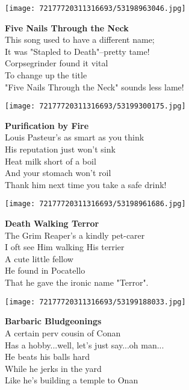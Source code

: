 \documentclass[10pt,letterpaper]{article}
\begin{document}
\begin{center}\texttt{[image: 72177720311316693/53198963046.jpg]}
\end{center}
\begin{center}
\textbf{Five Nails Through the Neck}\\
\vskip 0.2in
This song used to have a different name;\\
It was "Stapled to Death"--pretty tame!\\
Corpsegrinder found it vital\\
To change up the title\\
"Five Nails Through the Neck" sounds less lame!\\
\end{center}
\pagebreak

\begin{center}
\texttt{[image: 72177720311316693/53199300175.jpg]}
\end{center}

\begin{center}
\textbf{Purification by Fire}\\
\vskip 0.2in
Louis Pasteur's as smart as you think\\
His reputation just won't sink\\
Heat milk short of a boil\\
And your stomach won't roil\\
Thank him next time you take a safe drink!\\
\end{center}
\pagebreak

\begin{center}\texttt{[image: 72177720311316693/53198961686.jpg]}
\end{center}
\begin{center}
\textbf{Death Walking Terror}\\
\vskip 0.2in
The Grim Reaper's a kindly pet-carer\\
I oft see Him walking His terrier\\
A cute little fellow\\
He found in Pocatello\\
That he gave the ironic name "Terror".\\
\end{center}
\pagebreak

\begin{center}\texttt{[image: 72177720311316693/53199188033.jpg]}
\end{center}
\begin{center}
\textbf{Barbaric Bludgeonings}\\
\vskip 0.2in
A certain perv cousin of Conan\\
Has a hobby...well, let's just say...oh man...\\
He beats his balls hard\\
While he jerks in the yard\\
Like he's building a temple to Onan\\
\end{center}
\pagebreak
\end{document}
